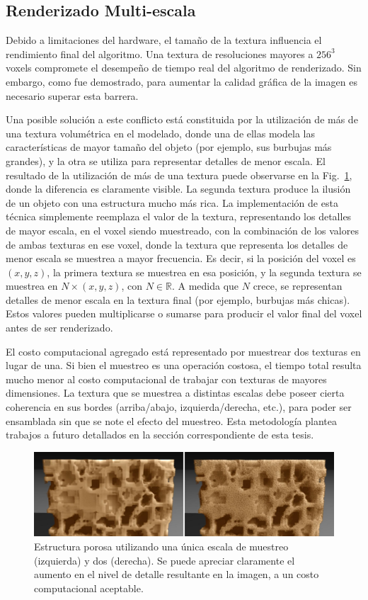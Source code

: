 \subsection{Renderizado Multi-escala}
Debido a limitaciones del hardware, el tamaño de la textura influencia el rendimiento final del algoritmo.
Una textura de resoluciones mayores a $256^{3}$ voxels compromete el desempeño de tiempo real del algoritmo de renderizado.
Sin embargo, como fue demostrado, para aumentar la calidad gráfica de la imagen es necesario superar esta barrera.

Una posible solución a este conflicto está constituida por la utilización de más de una textura volumétrica en el modelado, donde una de ellas modela las características de mayor tamaño del objeto (por ejemplo, sus burbujas más grandes), y la otra se utiliza para representar detalles de menor escala.
El resultado de la utilización de más de una textura puede observarse en la Fig.~\ref{fg:multiscale}, donde la diferencia es claramente visible.
La segunda textura produce la ilusión de un objeto con una estructura mucho más rica.
La implementación de esta técnica simplemente reemplaza el valor de la textura, representando los detalles de mayor escala, en el voxel siendo muestreado, con la combinación de los valores de ambas texturas en ese voxel, donde la textura que representa los detalles de menor escala se muestrea a mayor frecuencia.
Es decir, si la posición del voxel es $(x,y,z)$, la primera textura se muestrea en esa posición, y la segunda textura se muestrea en $N\times (x, y,z)$, con $N \in \mathbb{R}$.
A medida que $N$ crece, se representan detalles de menor escala en la textura final (por ejemplo, burbujas más chicas).
Estos valores pueden multiplicarse o sumarse para producir el valor final del voxel antes de ser renderizado.

El costo computacional agregado está representado por muestrear dos texturas en lugar de una.
Si bien el muestreo es una operación costosa, el tiempo total resulta mucho menor al costo computacional de trabajar con texturas de mayores dimensiones.
La textura que se muestrea a distintas escalas debe poseer cierta coherencia en sus bordes (arriba/abajo, izquierda/derecha, etc.), para poder ser ensamblada sin que se note el efecto del muestreo.
Esta metodología plantea trabajos a futuro detallados en la sección correspondiente de esta tesis.


\begin{figure}
  \centerline{\includegraphics[width=12cm]{figures/multiscale}}
  \caption[Estructura porosa utilizando una y dos escala de muestreo]{Estructura porosa utilizando una única escala de muestreo (izquierda) y dos (derecha). Se puede apreciar claramente el aumento en el nivel de detalle resultante en la imagen, a un costo computacional aceptable.}
  \label{fg:multiscale}
\end{figure}

